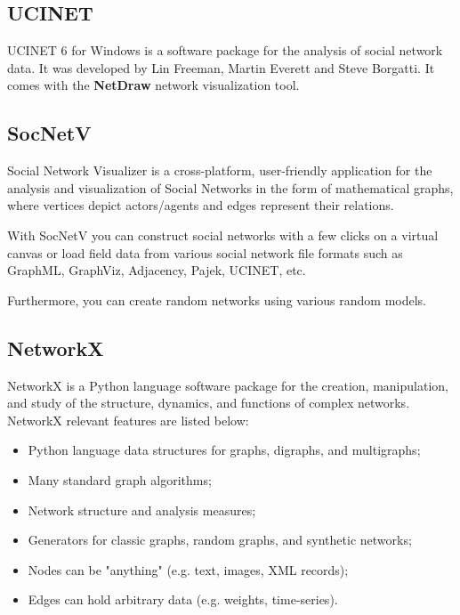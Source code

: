 \subsection{UCINET}

\indent \indent UCINET 6 \cite{ucinet-software} for Windows is a software package for the analysis of social network data. It was developed by Lin Freeman, Martin Everett and Steve Borgatti. It comes with the \textbf{NetDraw} \cite{borgatti2002netdraw} network visualization tool.

\subsection{SocNetV}

\indent \indent Social Network Visualizer \cite{socnetv} is a cross-platform, user-friendly application for the analysis and visualization of Social Networks in the form of mathematical graphs, where vertices depict actors/agents and edges represent their relations.

With SocNetV you can construct social networks with a few clicks on a virtual canvas or load field data from various social network file formats such as GraphML, GraphViz, Adjacency, Pajek, UCINET, etc.

Furthermore, you can create random networks using various random models.

\subsection{NetworkX}
\indent \indent NetworkX \cite{networkx} is a Python language software package for the creation, manipulation, and study of the structure, dynamics, and functions of complex networks. NetworkX relevant features are listed below:
\begin{itemize}
    \item Python language data structures for graphs, digraphs, and multigraphs;
    \item Many standard graph algorithms;
    \item Network structure and analysis measures;
    \item Generators for classic graphs, random graphs, and synthetic networks;
    \item Nodes can be "anything" (e.g. text, images, XML records);
    \item Edges can hold arbitrary data (e.g. weights, time-series).
\end{itemize}
